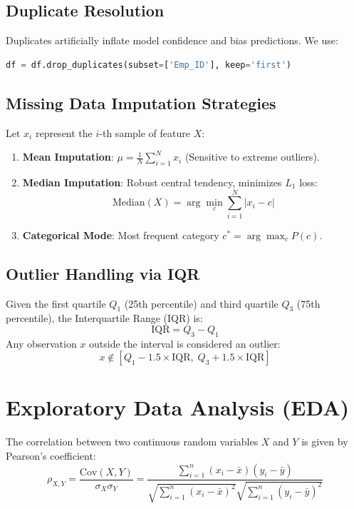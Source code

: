 \documentclass[11pt,a4paper]{article}
\begin{document}
\subsection{Duplicate Resolution}
Duplicates artificially inflate model confidence and bias predictions. We use:
\begin{lstlisting}[language=Python]
df = df.drop_duplicates(subset=['Emp_ID'], keep='first')
\end{lstlisting}

\subsection{Missing Data Imputation Strategies}
Let $x_i$ represent the $i$-th sample of feature $X$:
\begin{enumerate}
    \item \textbf{Mean Imputation}: $\mu = \frac{1}{N} \sum_{i=1}^N x_i$ (Sensitive to extreme outliers).
    \item \textbf{Median Imputation}: Robust central tendency, minimizes $L_1$ loss:
    \begin{equation}
    \text{Median}(X) = \arg\min_c \sum_{i=1}^N |x_i - c|
    \end{equation}
    \item \textbf{Categorical Mode}: Most frequent category $c^* = \arg\max_c P(c)$.
\end{enumerate}

\subsection{Outlier Handling via IQR}
Given the first quartile $Q_1$ (25th percentile) and third quartile $Q_3$ (75th percentile), the Interquartile Range (IQR) is:
\begin{equation}
\text{IQR} = Q_3 - Q_1
\end{equation}
Any observation $x$ outside the interval is considered an outlier:
\begin{equation}
x \notin [Q_1 - 1.5 \times \text{IQR}, \; Q_3 + 1.5 \times \text{IQR}]
\end{equation}

\section{Exploratory Data Analysis (EDA)}
The correlation between two continuous random variables $X$ and $Y$ is given by Pearson's coefficient:
\begin{equation}
\rho_{X, Y} = \frac{\text{Cov}(X, Y)}{\sigma_X \sigma_Y} = \frac{\sum_{i=1}^n (x_i - \bar{x})(y_i - \bar{y})}{\sqrt{\sum_{i=1}^n (x_i - \bar{x})^2}\sqrt{\sum_{i=1}^n (y_i - \bar{y})^2}}
\end{equation}
\end{document}
